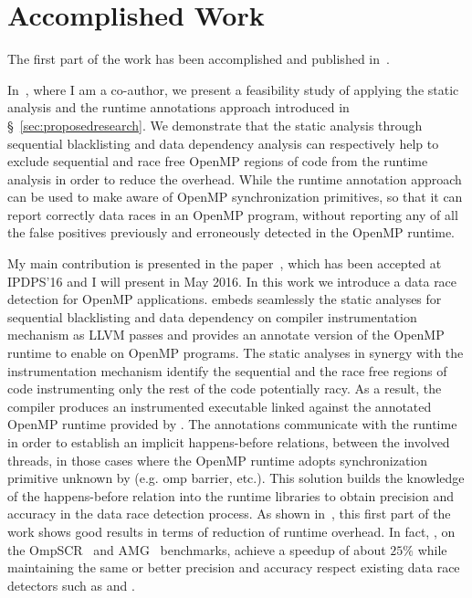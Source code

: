 \section{Accomplished Work}
\label{sec:accomplishedwork}

The first part of the work has been accomplished and published
in~\cite{Protze:2014:TPL:2688361.2688369, atzeni2016}.

In~\cite{Protze:2014:TPL:2688361.2688369}, where I am a co-author, we present
a feasibility study of applying the static analysis and the runtime
annotations approach introduced in \S~\ref{sec:proposedresearch}.
%
We demonstrate that the static analysis through sequential blacklisting and
data dependency analysis can respectively help to exclude sequential and race
free OpenMP regions of code from the runtime analysis in order to reduce the
overhead.
%
While the runtime annotation approach can be used to make \tsan aware of
OpenMP synchronization primitives, so that it can report correctly data races
in an OpenMP program, without reporting any of all the false positives
previously and erroneously detected in the OpenMP runtime.

My main contribution is presented in the paper~\cite{atzeni2016}, which has
been accepted at IPDPS'16 and I will present in May 2016.
%
In this work we introduce \archer a data race detection for OpenMP applications.
%
\archer embeds seamlessly the static analyses for sequential blacklisting and
data dependency on \tsan compiler instrumentation mechanism as LLVM passes and
provides an annotate version of the OpenMP runtime to enable \tsan on OpenMP
programs.
%
The static analyses in synergy with the instrumentation mechanism identify the
sequential and the race free regions of code instrumenting only the rest of
the code potentially racy.
%
As a result, the compiler produces an instrumented executable linked against
the annotated OpenMP runtime provided by \archer.
%
The annotations communicate with the \tsan runtime in order to establish an
implicit happens-before relations, between the involved threads, in those
cases where the OpenMP runtime adopts synchronization primitive unknown by
\tsan (e.g. omp barrier, etc.).
%
This solution builds the knowledge of the happens-before relation into the
runtime libraries to obtain precision and accuracy in the data race detection
process.
%
As shown in~\cite{atzeni2016}, this first part of the work shows good results
in terms of reduction of runtime overhead.
%
In fact, \archer, on the OmpSCR~\cite{ompscr} and AMG~\cite{amg2013}
benchmarks, achieve a speedup of about $25\%$ while maintaining the same or
better precision and accuracy respect existing data race detectors such as
\insp and \tsan.

